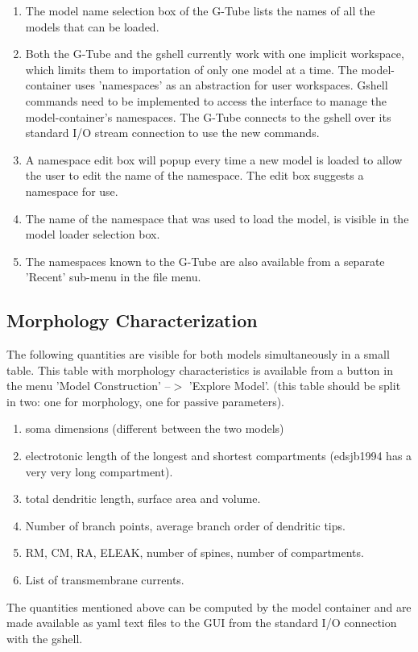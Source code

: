 \documentclass[12pt]{article}
\begin{document}
\begin{enumerate}
\item The model name selection box of the G-Tube lists the names of
  all the models that can be loaded.
\item Both the G-Tube and the gshell currently work with one implicit
  workspace, which limits them to importation of only one model at a
  time.  The model-container uses 'namespaces' as an abstraction for
  user workspaces.  Gshell commands need to be implemented to access
  the interface to manage the model-container's namespaces.  The
  G-Tube connects to the gshell over its standard I/O stream
  connection to use the new commands.
\item A namespace edit box will popup every time a new model is loaded
  to allow the user to edit the name of the namespace.  The edit box
  suggests a namespace for use.
\item The name of the namespace that was used to load the model, is
  visible in the model loader selection box.
\item The namespaces known to the G-Tube are also available from a
  separate 'Recent' sub-menu in the file menu.
\end{enumerate}


\subsection{Morphology Characterization}
The following quantities are visible for both models simultaneously
in a small table.  This table with morphology characteristics is
available from a button in the menu 'Model Construction' --$>$
'Explore Model'.  (this table should be split in two: one for
morphology, one for passive parameters).
\begin{enumerate}
\item soma dimensions (different between the two models)
\item electrotonic length of the longest and shortest compartments
  (edsjb1994 has a very very long compartment).
\item total dendritic length, surface area and volume.
\item Number of branch points, average branch order of dendritic tips.
\item RM, CM, RA, ELEAK, number of spines, number of compartments.
\item List of transmembrane currents.
\end{enumerate}
The quantities mentioned above can be computed by the model container
and are made available as yaml text files to the GUI from the standard
I/O connection with the gshell.
\end{document}
